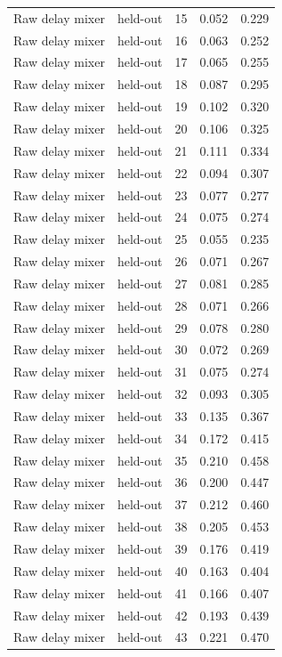\begin{tabular}{llrrr}
Raw delay mixer & held-out & 15 & 0.052 & 0.229 \\
Raw delay mixer & held-out & 16 & 0.063 & 0.252 \\
Raw delay mixer & held-out & 17 & 0.065 & 0.255 \\
Raw delay mixer & held-out & 18 & 0.087 & 0.295 \\
Raw delay mixer & held-out & 19 & 0.102 & 0.320 \\
Raw delay mixer & held-out & 20 & 0.106 & 0.325 \\
Raw delay mixer & held-out & 21 & 0.111 & 0.334 \\
Raw delay mixer & held-out & 22 & 0.094 & 0.307 \\
Raw delay mixer & held-out & 23 & 0.077 & 0.277 \\
Raw delay mixer & held-out & 24 & 0.075 & 0.274 \\
Raw delay mixer & held-out & 25 & 0.055 & 0.235 \\
Raw delay mixer & held-out & 26 & 0.071 & 0.267 \\
Raw delay mixer & held-out & 27 & 0.081 & 0.285 \\
Raw delay mixer & held-out & 28 & 0.071 & 0.266 \\
Raw delay mixer & held-out & 29 & 0.078 & 0.280 \\
Raw delay mixer & held-out & 30 & 0.072 & 0.269 \\
Raw delay mixer & held-out & 31 & 0.075 & 0.274 \\
Raw delay mixer & held-out & 32 & 0.093 & 0.305 \\
Raw delay mixer & held-out & 33 & 0.135 & 0.367 \\
Raw delay mixer & held-out & 34 & 0.172 & 0.415 \\
Raw delay mixer & held-out & 35 & 0.210 & 0.458 \\
Raw delay mixer & held-out & 36 & 0.200 & 0.447 \\
Raw delay mixer & held-out & 37 & 0.212 & 0.460 \\
Raw delay mixer & held-out & 38 & 0.205 & 0.453 \\
Raw delay mixer & held-out & 39 & 0.176 & 0.419 \\
Raw delay mixer & held-out & 40 & 0.163 & 0.404 \\
Raw delay mixer & held-out & 41 & 0.166 & 0.407 \\
Raw delay mixer & held-out & 42 & 0.193 & 0.439 \\
Raw delay mixer & held-out & 43 & 0.221 & 0.470 \\

\end{tabular}
